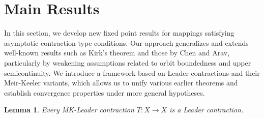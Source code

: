 \documentclass{birkjour}
\newtheorem{lem}[thm]{Lemma}
\theoremstyle{definition}
\theoremstyle{remark}
\numberwithin{equation}{section}
\begin{document}
\section{Main Results}\label{sec:main-results}
In this section, we develop new fixed point results for mappings satisfying asymptotic contraction-type conditions. Our approach generalizes and extends well-known results such as Kirk's theorem and those by Chen and Arav, particularly by weakening assumptions related to orbit boundedness and upper semicontinuity. We introduce a framework based on Leader contractions and their Meir-Keeler variants, which allows us to unify various earlier theorems and establish convergence properties under more general hypotheses.


\begin{lem}\label{mk_leader_is_leader}
Every MK-Leader contraction \(T : X \to X\) is a Leader contraction.
\end{lem}
\end{document}
